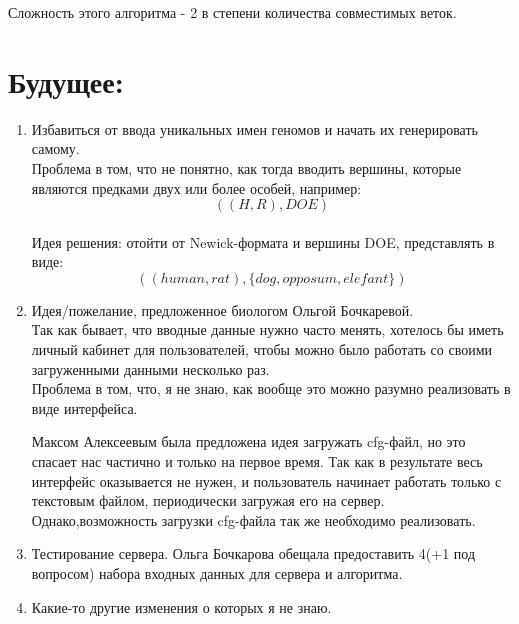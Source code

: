\documentclass{article}
\begin{document}
Сложность этого алгоритма - 2 в степени количества совместимых веток. 

\section{Будущее:}
\begin{enumerate}
	\item Избавиться от ввода уникальных
 имен геномов и начать их генерировать самому. \\
		Проблема в том, что не понятно, как тогда вводить вершины, которые являются предками
 двух или более особей, например: $$((H,R),DOE)$$\\
		Идея решения: отойти от Newick-формата и вершины DOE, представлять в виде:
 $$((human, rat), \{dog, opposum, elefant\})$$
	\item Идея/пожелание, предложенное биологом Ольгой Бочкаревой. \\
		Так как бывает, что вводные 
данные нужно часто менять, хотелось бы иметь личный кабинет для пользователей, чтобы можно было работать со своими загруженными
 данными несколько раз. \\
		Проблема в том, что, я не знаю, как вообще это можно разумно реализовать в виде интерфейса. 
		
Максом Алексеевым была предложена идея загружать cfg-файл, но это спасает нас частично и только на первое время. Так как в результате весь интерфейс оказывается
 не нужен, и пользователь начинает работать только с текстовым файлом, 	периодически загружая его на сервер. Однако,возможность загрузки cfg-файла так же 
необходимо реализовать. 
	\item Тестирование сервера. Ольга Бочкарова обещала предоставить 4(+1 под вопросом) набора входных данных для сервера и алгоритма. 
	\item Какие-то другие изменения о которых я не знаю.    
\end{enumerate}
\end{document}
